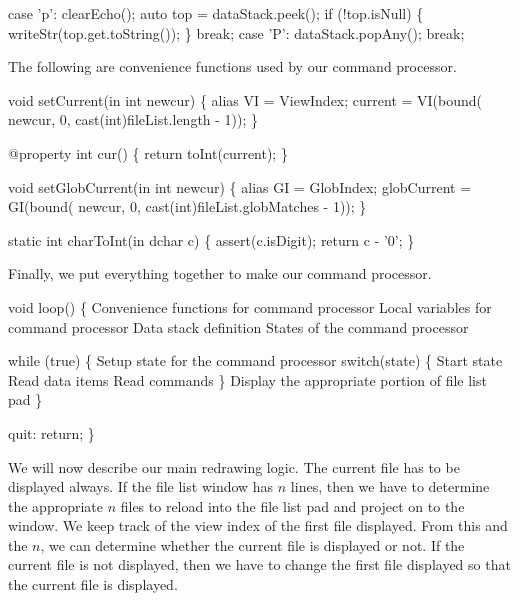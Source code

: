 \nwenddocs{}\plusendmoddef\nwstartdeflinemarkup\nwenddeflinemarkup
case 'p':
  clearEcho();
  auto top = dataStack.peek();
  if (!top.isNull) \{
    writeStr(top.get.toString());
  \}
  break;
case 'P':
  dataStack.popAny();
  break;

\nwendcode{}The following are convenience functions used by our command
processor.

\nwenddocs{}\endmoddef\nwstartdeflinemarkup\nwenddeflinemarkup
void setCurrent(in int newcur)
\{
  alias VI = ViewIndex;
  current = VI(bound(
                 newcur,
                 0,
                 cast(int)fileList.length - 1));
\}

@property
int cur()
\{
  return toInt(current);
\}

void setGlobCurrent(in int newcur)
\{
  alias GI = GlobIndex;
  globCurrent = GI(bound(
                 newcur,
                 0,
                 cast(int)fileList.globMatches - 1));
\}

static int charToInt(in dchar c)
\{
  assert(c.isDigit);
  return c - '0';
\}

\nwendcode{}Finally, we put everything together to make our command processor.

\nwenddocs{}\endmoddef\nwstartdeflinemarkup\nwenddeflinemarkup
void loop()
\{
  \LA{}Convenience functions for command processor\RA{}
  \LA{}Local variables for command processor\RA{}
  \LA{}Data stack definition\RA{}
  \LA{}States of the command processor\RA{}

  while (true) \{
    \LA{}Setup state for the command processor\RA{}
    switch(state) \{
      \LA{}Start state\RA{}
      \LA{}Read data items\RA{}
      \LA{}Read commands\RA{}
    \}
    \LA{}Display the appropriate portion of file list pad\RA{}
  \}

quit: return;
\}

\nwendcode{}We will now describe our main redrawing logic. The current file has
to be displayed always. If the file list window has $n$ lines, then we
have to determine the appropriate $n$ files to reload into the file
list pad and project on to the window. We keep track of the view index
of the first file displayed. From this and the $n$, we can determine
whether the current file is displayed or not. If the current file is
not displayed, then we have to change the first file displayed so that
the current file is displayed.

